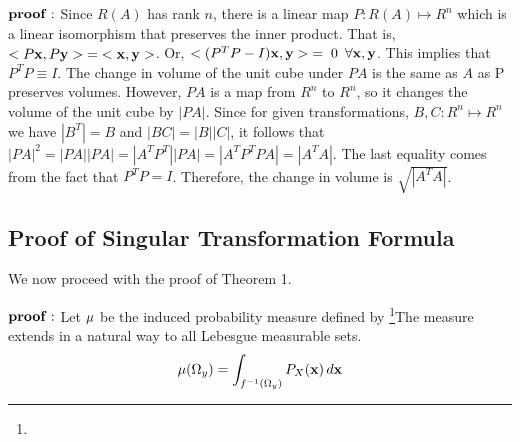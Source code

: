 ${\bf proof:}$ Since $R(A)$ has rank $n$, there is a linear map 
$P: R(A) \mapsto R^n$ which is a linear isomorphism that preserves the 
inner product. That is, $<P {\bf x}, P{\bf y}> \; = \; <{\bf x}, {\bf y}>$. Or,
$<(P^TP  - I){\bf x}, {\bf y}> \; = \; 0 \enspace \forall {\bf x}, {\bf y}$. 
This implies that $P^TP \equiv I$. The change in volume of the 
unit cube under $PA$ is the same as $A$ as P preserves volumes. However,
$PA$ is a map from $R^n$ to $R^n$, so it changes the volume of the unit cube
by $|PA|$. Since for given transformations, $B, C: R^n \mapsto R^n$ we have 
$|B^T| = B$ and $|BC| = |B| |C|$, it follows that 
$|PA|^2 = |PA| |PA| = |A^TP^T| |PA| = |A^TP^T P A| = |A^TA|$. The last 
equality comes from the fact that $P^TP = I$.
Therefore, the change in volume is $\sqrt{|A^TA|}$.

\bigskip

\subsection{Proof of Singular Transformation Formula}

We now proceed with the proof of Theorem 1.
\smallskip

${\bf proof:}$ Let ${\bf \mu}$ be the induced probability measure defined by%
\footnote{\dag}{The measure extends in a natural way to all Lebesgue measurable sets.}
$$
{\bf \mu}(\Omega_y) = \int_{f^{-1}(\Omega_y)} P_X({\bf x}) \, d{\bf x}
$$

